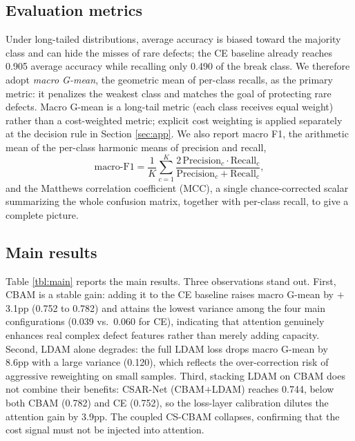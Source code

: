 \documentclass[a4paper,fleqn]{cas-sc}
\begin{document}
\begin{sloppypar}
	\subsection{Evaluation metrics}
	\label{sec:metrics}
	\par{
		Under long-tailed distributions, average accuracy is biased toward the majority class and can hide the misses of rare defects; the CE baseline already reaches 0.905 average accuracy while recalling only 0.490 of the break class. We therefore adopt \emph{macro G-mean}, the geometric mean of per-class recalls, as the primary metric: it penalizes the weakest class and matches the goal of protecting rare defects. Macro G-mean is a long-tail metric (each class receives equal weight) rather than a cost-weighted metric; explicit cost weighting is applied separately at the decision rule in Section \ref{sec:app}. We also report macro F1, the arithmetic mean of the per-class harmonic means of precision and recall,
\begin{equation}
	\text{macro-F1}=\frac{1}{K}\sum_{c=1}^{K}\frac{2\,\mathrm{Precision}_c\cdot\mathrm{Recall}_c}{\mathrm{Precision}_c+\mathrm{Recall}_c},
	\label{eq:macroF1}
\end{equation}
and the Matthews correlation coefficient (MCC), a single chance-corrected scalar summarizing the whole confusion matrix, together with per-class recall, to give a complete picture.
	}

	\subsection{Main results}
	\label{sec:mainres}
	\par{
		Table \ref{tbl:main} reports the main results. Three observations stand out. First, CBAM is a stable gain: adding it to the CE baseline raises macro G-mean by $+$3.1pp (0.752 to 0.782) and attains the lowest variance among the four main configurations (0.039 vs.\ 0.060 for CE), indicating that attention genuinely enhances real complex defect features rather than merely adding capacity. Second, LDAM alone degrades: the full LDAM loss drops macro G-mean by 8.6pp with a large variance (0.120), which reflects the over-correction risk of aggressive reweighting on small samples. Third, stacking LDAM on CBAM does not combine their benefits: CSAR-Net (CBAM$+$LDAM) reaches 0.744, below both CBAM (0.782) and CE (0.752), so the loss-layer calibration dilutes the attention gain by 3.9pp. The coupled CS-CBAM collapses, confirming that the cost signal must not be injected into attention.
	}


\end{sloppypar}
\end{document}
